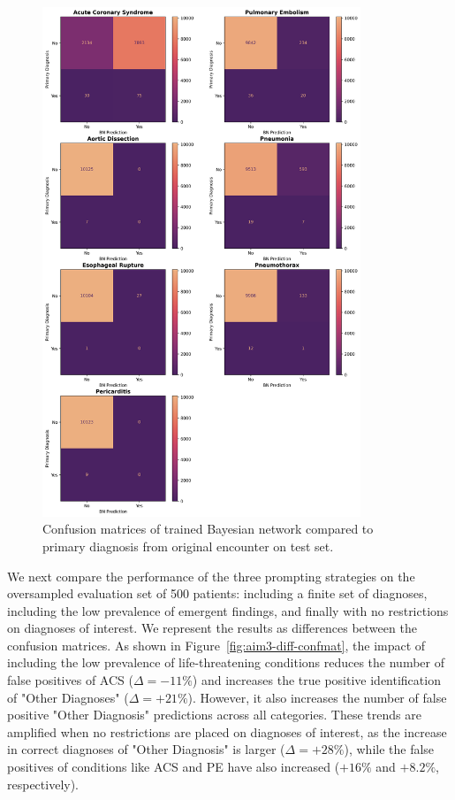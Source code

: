 \begin{figure}[H]
	\centering
	\includegraphics[width=0.85\textwidth] {figures/aim3/bn_confmats.png}
	\caption{Confusion matrices of trained Bayesian network compared to primary diagnosis from original encounter on test set.} \label{fig:aim3-bn-confmats}
\end{figure}


We next compare the performance of the three prompting strategies on the oversampled evaluation set of 500 patients: including a finite set of diagnoses, including the low prevalence of emergent findings, and finally with no restrictions on diagnoses of interest. We represent the results as differences between the confusion matrices. As shown in Figure~\ref{fig:aim3-diff-confmat}, the impact of including the low prevalence of life-threatening conditions reduces the number of false positives of ACS ($\Delta=-11\%$) and increases the true positive identification of "Other Diagnoses" ($\Delta=+21\%$). However, it also increases the number of false positive "Other Diagnosis" predictions across all categories. These trends are amplified when no restrictions are placed on diagnoses of interest, as the increase in correct diagnoses of "Other Diagnosis" is larger ($\Delta=+28\%$), while the false positives of conditions like ACS and PE have also increased ($+16\%$ and $+8.2\%$, respectively).

